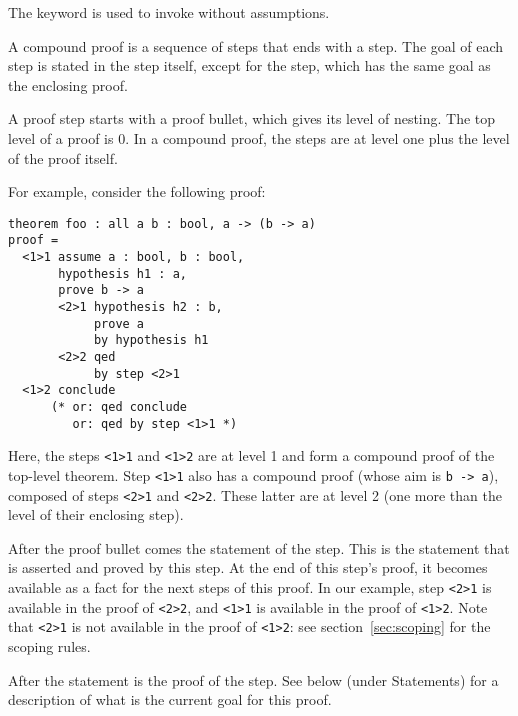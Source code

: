 The  keyword is used to invoke {\zenon} without
assumptions.

A compound proof is a sequence of steps that ends with a 
step.  The goal of each step is stated in the step itself, except for
the  step, which has the same goal as the enclosing
proof.

\begin{syn}
 \is
       
\end{syn}


A proof step starts with a proof bullet, which gives its level of
nesting.  The top level of a proof is 0.  In a compound proof, the
steps are at level one plus the level of the proof itself.

\goodbreak
For example, consider the following proof:

{\scriptsize
\begin{lstlisting}
theorem foo : all a b : bool, a -> (b -> a)
proof =
  <1>1 assume a : bool, b : bool,
       hypothesis h1 : a,
       prove b -> a
       <2>1 hypothesis h2 : b,
            prove a
            by hypothesis h1
       <2>2 qed
            by step <2>1
  <1>2 conclude
      (* or: qed conclude
         or: qed by step <1>1 *)
\end{lstlisting}}

Here, the steps \verb"<1>1" and \verb"<1>2" are at level 1
and form a compound proof of the top-level theorem.  Step \verb"<1>1"
also has a compound proof (whose aim is \verb"b -> a"), composed of
steps \verb"<2>1" 
and \verb"<2>2".  These latter are at level 2 (one more than the level of
their enclosing step).

After the proof bullet comes the statement of the step.  This is the
statement that is asserted and proved by this step.  At the end of
this step's proof, it becomes available as a fact for the next steps
of this proof.  In our example, step \verb"<2>1" is available in the
proof of \verb"<2>2", and \verb"<1>1" is available in the proof of
\verb"<1>2".  Note that \verb"<2>1" is not available in the proof of
\verb"<1>2": see section~\ref{sec:scoping} for the scoping rules.

After the statement is the proof of the step.  See below (under
Statements) for a description of what is the current goal for this
proof.

